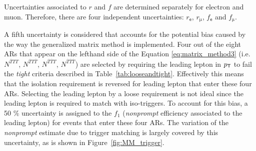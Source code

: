 Uncertainties associated to $r$ and $f$ are determined separately for electron and muon. Therefore, there are four independent uncertainties: $r_{\textsf{e}}$, $r_{\upmu}$, $f_{\textsf{e}}$ and $f_{\upmu}$. 

A fifth uncertainty is considered that accounts for the potential bias caused by the way the generalized matrix method is implemented. Four out of the eight \acp{AR} that appear on the lefthand side of the Equation \ref{eq:matrix_method3} (i.e. $N^{\overline{T}TT}$, $N^{\overline{T}T\overline{T}}$, $N^{\overline{T}\overline{T}T}$, $N^{\overline{T}\overline{T}\overline{T}}$) are selected by requiring the leading lepton in $p_{\textsf{T}}$ to fail the \emph{tight} criteria described in Table~\ref{tab:looseandtight}. Effectively this means that the isolation requirement is reversed for leading lepton that enter these four \acp{AR}. Selecting the leading lepton by a loose requirement is not ideal since the leading lepton is required to match with iso-triggers. To account for this bias, a 50 $\%$ uncertainty is assigned to the $f_1$ (\emph{nonprompt} efficiency associated to the leading lepton) for events that enter these four \acp{AR}. The variation of the \emph{nonprompt} estimate due to trigger matching is largely covered by this uncertainty, as is shown in Figure~\ref{fig:MM_trigger}.

